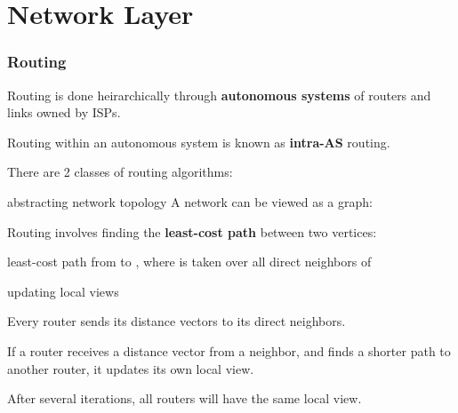 \part{Network Layer}


\section{Routing}
Routing is done heirarchically through \textbf{autonomous systems} of routers and links
owned by ISPs.

Routing within an autonomous system is known as \textbf{intra-AS} routing.

There are 2 classes of routing algorithms:
\begin{enumerate*}
\end{enumerate*}

\begin{defn}{abstracting network topology}
    A network can be viewed as a graph:
    \begin{itemize}
    \end{itemize}

    Routing involves finding the \textbf{least-cost path} between two vertices:
    \begin{itemize*}
        {least-cost path from  to , where  is taken over all direct neighbors of }
    \end{itemize*}
\end{defn}

\begin{defn*}{updating local views}
    \begin{enumerate*}
        \item Every router sends its distance vectors to its direct neighbors.
        \item If a router receives a distance vector from a neighbor, and finds a shorter path to another router, it updates its own local view.
        \item After several iterations, all routers will have the same local view.
    \end{enumerate*}
\end{defn*}

